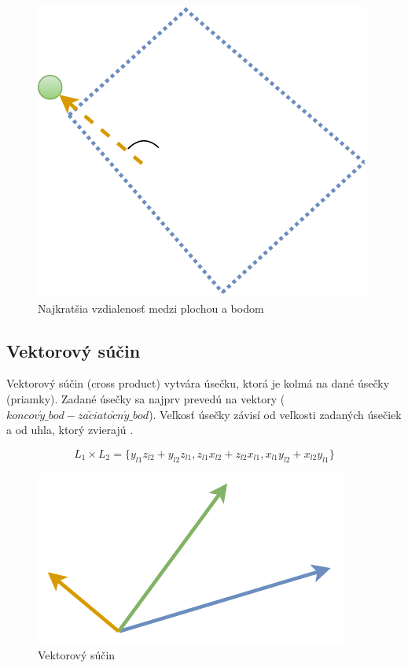



\begin{figure}[H]
	\centering
	\includegraphics[height=0.3\textwidth]{obrazky-figures/Diagram/Draw/2Line/DP Navrh operacii-1D - LineMinSP.pdf}
	\caption{Najkratšia vzdialenosť medzi plochou a bodom}
	\label{fig:LineMinSP}
\end{figure}


\subsection*{Vektorový súčin}\label{subsec:crossproduct}
Vektorový súčin (cross product) vytvára úsečku, ktorá je kolmá na dané úsečky (priamky). Zadané úsečky sa najprv prevedú na vektory ($koncov\acute{y}\_bod - za\check{c}iato\check{c}n\acute{y}\_bod$).
Veľkosť úsečky závisí od veľkosti zadaných úsečiek a od uhla, ktorý zvierajú \cite{modernipocitacovagrafika}. 

\begin{equation}
 L_1 \times L_2 =  \{
 y_{l1} z_{l2} + y_{l2} z_{l1} ,
 z_{l1} x_{l2} + z_{l2} x_{l1} ,
 x_{l1} y_{l2} + x_{l2} y_{l1}\}
    \label{eq:cross}
\end{equation}


\begin{figure}[H]
	\centering
	\includegraphics[height=0.3\textwidth]{obrazky-figures/Diagram/Draw/2Line/DP Navrh operacii-1D - LineCross.pdf}
	\caption{Vektorový súčin}
	\label{fig:LineCross}
\end{figure}


